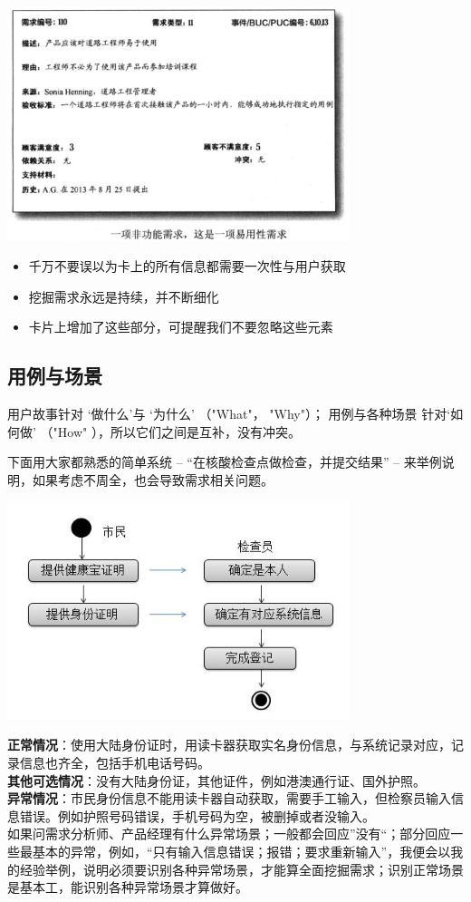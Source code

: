 \includegraphics[width=10cm]{9_用户故事3.png}

\begin{itemize}
\tightlist
\item
  千万不要误以为卡上的所有信息都需要一次性与用户获取
\item
  挖掘需求永远是持续，并不断细化
\item
  卡片上增加了这些部分，可提醒我们不要忽略这些元素
\end{itemize}

\hypertarget{ux7528ux4f8bux4e0eux573aux666f}{%
\subsection{用例与场景}\label{ux7528ux4f8bux4e0eux573aux666f}}

用户故事针对 `做什么'与 `为什么' （"What"， "Why"）； 用例与各种场景
针对`如何做' （"How" ），所以它们之间是互补，没有冲突。

下面用大家都熟悉的简单系统 -- ``在核酸检查点做检查，并提交结果'' --
来举例说明，如果考虑不周全，也会导致需求相关问题。


\includegraphics[width=10cm]{CI场景图.jpg}

\textbf{正常情况}：使用大陆身份证时，用读卡器获取实名身份信息，与系统记录对应，记录信息也齐全，包括手机电话号码。\\
\textbf{其他可选情况}：没有大陆身份证，其他证件，例如港澳通行证、国外护照。\\
\textbf{异常情况}：市民身份信息不能用读卡器自动获取，需要手工输入，但检察员输入信息错误。例如护照号码错误，手机号码为空，被删掉或者没输入。\\
如果问需求分析师、产品经理有什么异常场景；一般都会回应''没有``；部分回应一些最基本的异常，例如，``只有输入信息错误；报错；要求重新输入''，我便会以我的经验举例，说明必须要识别各种异常场景，才能算全面挖掘需求；识别正常场景是基本工，能识别各种异常场景才算做好。

